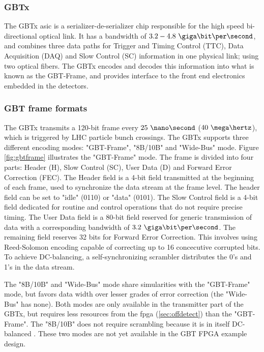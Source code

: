 \documentclass[main.tex]{subfiles}
\begin{document}
\subsubsection{GBTx}
The GBTx \gls{asic} is a serializer-de-serializer chip responsible for the high speed bi-directional optical link. It has a bandwidth of $3.2 - 4.8~\giga\bit\per\second$, and combines three data paths for Trigger and Timing Control (TTC), Data Acquisition (DAQ) and Slow Control (SC) information in one physical link; using two optical fibers. The GBTx encodes and decodes this information into what is known as the GBT-Frame, and provides interface to the front end electronics embedded in the detectors. \cite{gbtxman11}

\subsubsection{GBT frame formats}
 The GBTx transmits a 120-bit frame every $25~\nano\second$ ($40~\mega\hertz$), which is triggered by LHC particle bunch crossings. The GBTx supports three different encoding modes: "GBT-Frame", "8B/10B" and "Wide-Bus" mode. Figure \ref{fig:gbtframe} illustrates the "GBT-Frame" mode. The frame is divided into four parts: Header (H), Slow Control (SC), User Data (D) and Forward Error Correction (FEC). The Header field is a 4-bit field transmitted at the beginning of each frame, used to synchronize the data stream at the frame level. The header field can be set to "idle" (0110) or "data" (0101). The Slow Control field is a 4-bit field dedicated for routine and control operations that do not require precise timing. The User Data field is a 80-bit field reserved for generic transmission of data with a corresponding bandwidth of $3.2~\giga\bit\per\second$. The remaining field reserves 32 bits for Forward Error Correction. This involves using Reed-Solomon encoding capable of correcting up to 16 concecutive corrupted bits. To achieve DC-balancing, a self-synchronizing scrambler distributes the 0's and 1's in the data stream.

The "8B/10B" and "Wide-Bus" mode share simularities with the "GBT-Frame" mode, but favors data width over lesser grades of error correction (the "Wide-Bus" has none). Both modes are only available in the transmitter part of the GBTx, but requires less resources from the \gls{fpga} (\ref{sec:offdetect}) than the "GBT-Frame". The "8B/10B" does not require scrambling because it is in itself DC-balanced \cite{gbtxman11}. These two modes are not yet available in the GBT FPGA example design.
\end{document}
